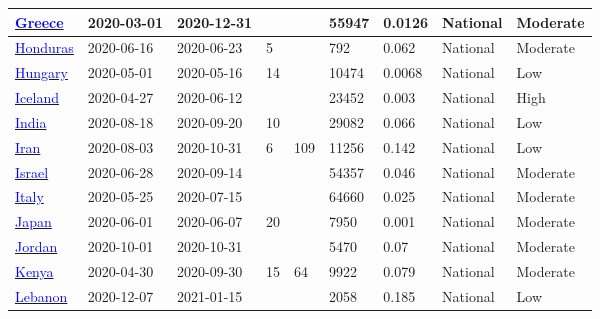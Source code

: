 \begin{table}[ht]
\begin{center}
\begin{tabular}{p{2cm} | p{1.6cm} | p{1.6cm} | p{0.8cm} | p{0.8cm} | p{1cm} | p{1.3cm} | p{1.2cm} | p{1.2cm}}
           \hline 
           \href{https://www.mdpi.com/2075-4418/12/2/295}{\textcolor{blue}{Greece}} & 2020-03-01 & 2020-12-31 &  &  & 55947 & 0.0126 & National & Moderate \\ 
           \hline 
           \href{https://revistas.ucr.ac.cr/index.php/psm/article/view/43261/46175}{\textcolor{blue}{Honduras}} & 2020-06-16 & 2020-06-23 & 5 &  & 792 & 0.062 & National & Moderate \\ 
           \hline 
           \href{https://dx.doi.org/10.1007/s11357-020-00226-9}{\textcolor{blue}{Hungary}} & 2020-05-01 & 2020-05-16 & 14 &  & 10474 & 0.0068 & National & Low \\ 
           \hline 
           \href{http://dx.doi.org/10.1056/NEJMoa2026116}{\textcolor{blue}{Iceland}} & 2020-04-27 & 2020-06-12 &  &  & 23452 & 0.003 & National & High \\ 
           \hline 
           \href{https://dx.doi.org/10.1016/S2214-109X(20)30544-1}{\textcolor{blue}{India}} & 2020-08-18 & 2020-09-20 & 10 &  & 29082 & 0.066 & National & Low \\ 
           \hline 
           \href{http://dx.doi.org/10.1016/j.cmi.2021.06.002}{\textcolor{blue}{Iran}} & 2020-08-03 & 2020-10-31 & 6 & 109 & 11256 & 0.142 & National & Low \\ 
           \hline 
           \href{https://dx.doi.org/10.1007/s10654-021-00749-1}{\textcolor{blue}{Israel}} & 2020-06-28 & 2020-09-14 &  &  & 54357 & 0.046 & National & Moderate \\ 
           \hline 
           \href{https://www.istat.it/it/files//2020/08/ReportPrimiRisultatiIndagineSiero.pdf}{\textcolor{blue}{Italy}} & 2020-05-25 & 2020-07-15 &  &  & 64660 & 0.025 & National & Moderate \\ 
           \hline 
           \href{https://dx.doi.org/10.3201/eid2702.204088}{\textcolor{blue}{Japan}} & 2020-06-01 & 2020-06-07 & 20 &  & 7950 & 0.001 & National & Moderate \\ 
           \hline 
           \href{http://dx.doi.org/10.1016/j.onehlt.2021.100292}{\textcolor{blue}{Jordan}} & 2020-10-01 & 2020-10-31 &  &  & 5470 & 0.07 & National & Moderate \\ 
           \hline 
           \href{https://dx.doi.org/10.1038/s41467-021-24062-3}{\textcolor{blue}{Kenya}} & 2020-04-30 & 2020-09-30 & 15 & 64 & 9922 & 0.079 & National & Moderate \\ 
           \hline 
           \href{https://dx.doi.org/10.1186/s12879-022-07031-z}{\textcolor{blue}{Lebanon}} & 2020-12-07 & 2021-01-15 &  &  & 2058 & 0.185 & National & Low \\ 

\end{tabular}
\end{center}
\end{table}
